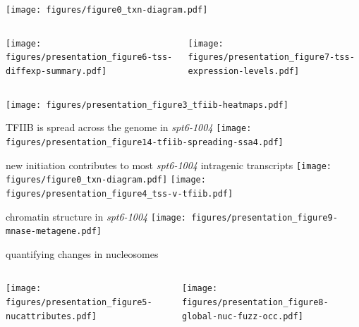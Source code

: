 \documentclass[aspectratio=169]{beamer}
\begin{document}
\begin{frame}
\end{frame}

\begin{frame}
    \centering
    \texttt{[image: figures/figure0\_txn-diagram.pdf]}
    \begin{columns}
        \begin{column}{0.5\textwidth}
            \centering
            \texttt{[image: figures/presentation\_figure6-tss-diffexp-summary.pdf]}
        \end{column}
        \begin{column}{0.5\textwidth}
            \centering
            \pause
            \texttt{[image: figures/presentation\_figure7-tss-expression-levels.pdf]}
        \end{column}
    \end{columns}
\end{frame}

\begin{frame}
    \centering
    \texttt{[image: figures/presentation\_figure3\_tfiib-heatmaps.pdf]}
\end{frame}

\begin{frame}{TFIIB is spread across the genome in \textit{spt6-1004}}
\texttt{[image: figures/presentation\_figure14-tfiib-spreading-ssa4.pdf]}
\end{frame}

\begin{frame}{new initiation contributes to most \textit{spt6-1004} intragenic transcripts}
    \centering
    \texttt{[image: figures/figure0\_txn-diagram.pdf]}
    \texttt{[image: figures/presentation\_figure4\_tss-v-tfiib.pdf]}
\end{frame}

\begin{frame}{chromatin structure in \textit{spt6-1004}}
\texttt{[image: figures/presentation\_figure9-mnase-metagene.pdf]}
\end{frame}

\begin{frame}{quantifying changes in nucleosomes}
    \begin{columns}
        \begin{column}{0.5\textwidth}
            \centering
            \texttt{[image: figures/presentation\_figure5-nucattributes.pdf]}
        \end{column}
        \begin{column}{0.5\textwidth}
            \centering
            \pause
            \texttt{[image: figures/presentation\_figure8-global-nuc-fuzz-occ.pdf]}
        \end{column}
    \end{columns}
\end{frame}
\end{document}
